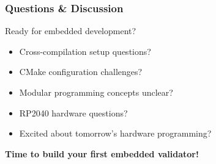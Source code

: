 \documentclass{beamer}
\begin{document}
\begin{frame}
\frametitle{Questions \& Discussion}
\begin{center}
\Large Ready for embedded development?
\end{center}

\begin{itemize}
    \item Cross-compilation setup questions?
    \item CMake configuration challenges?
    \item Modular programming concepts unclear?
    \item RP2040 hardware questions?
    \item Excited about tomorrow's hardware programming?
\end{itemize}

\vspace{1cm}
\begin{center}
\textbf{Time to build your first embedded validator!}
\end{center}
\end{frame}
\end{document}
